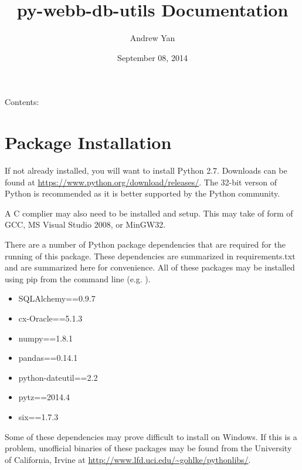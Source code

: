 \documentclass[letterpaper,10pt,english]{sphinxmanual}
\title{py-webb-db-utils Documentation}
\date{September 08, 2014}
\author{Andrew Yan}
\begin{document}
\maketitle
\tableofcontents
{}\label{webb_utils_doc::doc}


Contents:


\chapter{Package Installation}
\label{installation::doc}\label{installation:welcome-to-py-webb-db-utils-s-documentation}\label{installation:package-installation}
If not already installed, you will want to install Python 2.7. Downloads can be found
at \href{https://www.python.org/download/releases/}{https://www.python.org/download/releases/}. The 32-bit verson of Python is recommended
as it is better supported by the Python community.

A C complier may also need to be installed and setup. This may take of form of GCC,
MS Visual Studio 2008, or MinGW32.

There are a number of Python package dependencies that are required for the running
of this package. These dependencies are summarized in requirements.txt and are summarized
here for convenience. All of these packages may be installed using pip from the command line
(e.g. ).
\begin{itemize}
\item {} 
SQLAlchemy==0.9.7

\item {} 
cx-Oracle==5.1.3

\item {} 
numpy==1.8.1

\item {} 
pandas==0.14.1

\item {} 
python-dateutil==2.2

\item {} 
pytz==2014.4

\item {} 
six==1.7.3

\end{itemize}

Some of these dependencies may prove difficult to install on Windows. If this is a problem, unofficial
binaries of these packages may be found from the University of California, Irvine at
\href{http://www.lfd.uci.edu/~gohlke/pythonlibs/}{http://www.lfd.uci.edu/\textasciitilde{}gohlke/pythonlibs/}.
\end{document}
